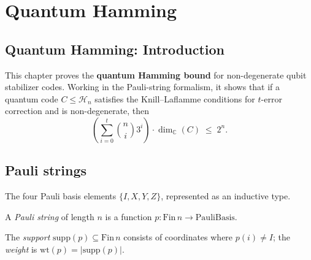 \section{Quantum Hamming}
\subsection*{Quantum Hamming: Introduction}

This chapter proves the \textbf{quantum Hamming bound} for non-degenerate
qubit stabilizer codes.  Working in the Pauli-string formalism, it shows that
if a quantum code $C \le \mathcal{H}_n$ satisfies the Knill--Laflamme
conditions for $t$-error correction and is non-degenerate, then
\[
\left(\sum_{i=0}^{t}\binom{n}{i}3^i\right)\cdot\dim_{\mathbb{C}}(C) \;\le\; 2^n.
\]

\subsection{Pauli strings}

\begin{definition}
\label{PauliBasis}
\leanok
{}
The four Pauli basis elements $\{I,X,Y,Z\}$, represented as an inductive type.
\end{definition}

\begin{definition}
\label{PauliString}
\leanok
{}
A \emph{Pauli string} of length $n$ is a function $p : \mathrm{Fin}\,n \to \mathrm{PauliBasis}$.
\end{definition}

\begin{definition}
\label{support}
\label{weight}
\leanok
{}
The \emph{support} $\mathrm{supp}(p) \subseteq \mathrm{Fin}\,n$ consists of coordinates
where $p(i) \neq I$; the \emph{weight} is $\mathrm{wt}(p) = |\mathrm{supp}(p)|$.
\end{definition}

